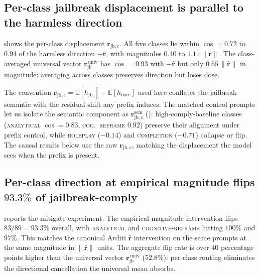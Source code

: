 \documentclass{article}
\newcommand{\rhat}{\hat{\bm{r}}}
\newcommand{\rjb}{\bm{r}_{\mathrm{jb}}}
\newcommand{\rjbc}{\bm{r}_{\mathrm{jb},c}}
\newcommand{\rjbsemc}{\bm{r}_{\mathrm{jb},c}^{\mathrm{sem}}}
\newcommand{\norm}[1]{\lVert #1 \rVert}
\begin{document}
\subsection{Per-class jailbreak displacement is parallel to the
harmless direction}
\label{sec:perclass}

 shows the per-class displacement $\rjbc$. All
five classes lie within $\cos = 0.72$ to $0.94$ of the harmless
direction $-\rhat$, with magnitudes $0.40$ to $1.11\,\norm{\rhat}$.
The class-averaged universal vector $\rjb^{\,\mathrm{univ}}$ has
$\cos = 0.93$ with $-\rhat$ but only $0.65\,\norm{\rhat}$ in
magnitude: averaging across classes preserves direction but loses
dose.

The convention $\rjbc = \mathbb{E}[h_{\mathrm{jb}_c}] -
\mathbb{E}[h_{\mathrm{bare}}]$ used here conflates the jailbreak
semantic with the residual shift any prefix induces. The matched
control prompts let us isolate the semantic component as $\rjbsemc$
(): high-comply-baseline classes
(\textsc{analytical} $\cos = 0.83$, \textsc{cog.~reframe} $0.92$)
preserve their alignment under prefix control, while
\textsc{roleplay} ($-0.14$) and \textsc{completion} ($-0.71$)
collapse or flip. The causal results below use the raw $\rjbc$,
matching the displacement the model sees when the prefix is present.

\subsection{Per-class direction at empirical magnitude flips
$93.3\%$ of jailbreak-comply}
\label{sec:perclass-causal}

 reports the mitigate experiment. The
empirical-magnitude intervention flips $83/89 = 93.3\%$ overall,
with \textsc{analytical} and \textsc{cognitive-reframe} hitting
$100\%$ and $97\%$. This matches the canonical Arditi $\rhat$
intervention on the same prompts at the same magnitude in
$\norm{\rhat}$ units. The aggregate flip rate is over $40$ percentage
points higher than the universal vector $\rjb^{\,\mathrm{univ}}$
($52.8\%$): per-class routing eliminates the directional
cancellation the universal mean absorbs.
\end{document}
